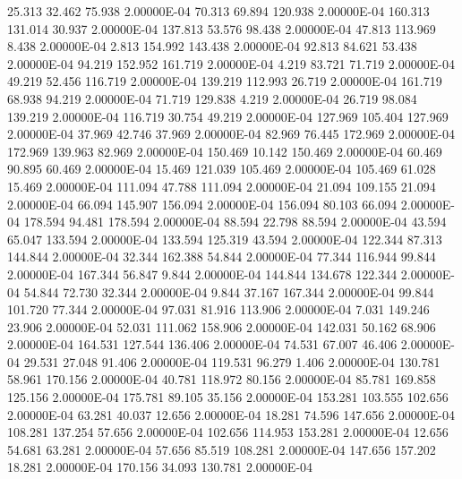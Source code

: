     25.313    32.462    75.938  2.00000E-04
    70.313    69.894   120.938  2.00000E-04
   160.313   131.014    30.937  2.00000E-04
   137.813    53.576    98.438  2.00000E-04
    47.813   113.969     8.438  2.00000E-04
     2.813   154.992   143.438  2.00000E-04
    92.813    84.621    53.438  2.00000E-04
    94.219   152.952   161.719  2.00000E-04
     4.219    83.721    71.719  2.00000E-04
    49.219    52.456   116.719  2.00000E-04
   139.219   112.993    26.719  2.00000E-04
   161.719    68.938    94.219  2.00000E-04
    71.719   129.838     4.219  2.00000E-04
    26.719    98.084   139.219  2.00000E-04
   116.719    30.754    49.219  2.00000E-04
   127.969   105.404   127.969  2.00000E-04
    37.969    42.746    37.969  2.00000E-04
    82.969    76.445   172.969  2.00000E-04
   172.969   139.963    82.969  2.00000E-04
   150.469    10.142   150.469  2.00000E-04
    60.469    90.895    60.469  2.00000E-04
    15.469   121.039   105.469  2.00000E-04
   105.469    61.028    15.469  2.00000E-04
   111.094    47.788   111.094  2.00000E-04
    21.094   109.155    21.094  2.00000E-04
    66.094   145.907   156.094  2.00000E-04
   156.094    80.103    66.094  2.00000E-04
   178.594    94.481   178.594  2.00000E-04
    88.594    22.798    88.594  2.00000E-04
    43.594    65.047   133.594  2.00000E-04
   133.594   125.319    43.594  2.00000E-04
   122.344    87.313   144.844  2.00000E-04
    32.344   162.388    54.844  2.00000E-04
    77.344   116.944    99.844  2.00000E-04
   167.344    56.847     9.844  2.00000E-04
   144.844   134.678   122.344  2.00000E-04
    54.844    72.730    32.344  2.00000E-04
     9.844    37.167   167.344  2.00000E-04
    99.844   101.720    77.344  2.00000E-04
    97.031    81.916   113.906  2.00000E-04
     7.031   149.246    23.906  2.00000E-04
    52.031   111.062   158.906  2.00000E-04
   142.031    50.162    68.906  2.00000E-04
   164.531   127.544   136.406  2.00000E-04
    74.531    67.007    46.406  2.00000E-04
    29.531    27.048    91.406  2.00000E-04
   119.531    96.279     1.406  2.00000E-04
   130.781    58.961   170.156  2.00000E-04
    40.781   118.972    80.156  2.00000E-04
    85.781   169.858   125.156  2.00000E-04
   175.781    89.105    35.156  2.00000E-04
   153.281   103.555   102.656  2.00000E-04
    63.281    40.037    12.656  2.00000E-04
    18.281    74.596   147.656  2.00000E-04
   108.281   137.254    57.656  2.00000E-04
   102.656   114.953   153.281  2.00000E-04
    12.656    54.681    63.281  2.00000E-04
    57.656    85.519   108.281  2.00000E-04
   147.656   157.202    18.281  2.00000E-04
   170.156    34.093   130.781  2.00000E-04
